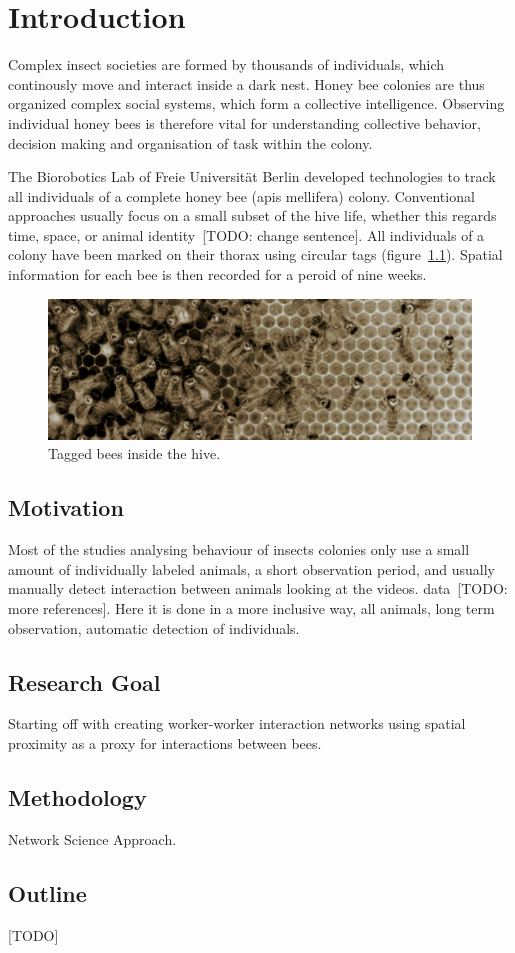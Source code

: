 \chapter{Introduction}
\label{ch:intro}

Complex insect societies are formed by thousands of individuals, which continously move and interact inside a dark nest. Honey bee colonies are thus organized complex social systems, which form a collective intelligence. Observing individual honey bees is therefore vital for understanding collective behavior, decision making and organisation of task within the colony.

The Biorobotics Lab of Freie Universität Berlin developed technologies to track all individuals of a complete honey bee (apis mellifera) colony. Conventional approaches usually focus on a small subset of the hive life, whether this regards time, space, or animal identity~\cite{wario2015automatic}[TODO: change sentence]. All individuals of a colony have been marked on their thorax using circular tags (figure~\ref{fig:markers}). Spatial information for each bee is then recorded for a peroid of nine weeks.


\begin{figure}[htb]
	\centering
	\includegraphics[width=1.0\textwidth]{Figures/markers}
	\caption{Tagged bees inside the hive.}
	\label{fig:markers}
\end{figure}

\section{Motivation}

Most of the studies analysing behaviour of insects colonies only use a small amount of individually labeled animals, a short observation period, and usually manually detect interaction between animals looking at the videos. data~\cite{quevillon2015social}[TODO: more references]. Here it is done in a more inclusive way, all animals, long term observation, automatic detection of individuals.

\section{Research Goal}

Starting off with creating worker-worker interaction networks using spatial proximity as a proxy for interactions between bees.


\section{Methodology}

Network Science Approach.

\section{Outline}
[TODO]